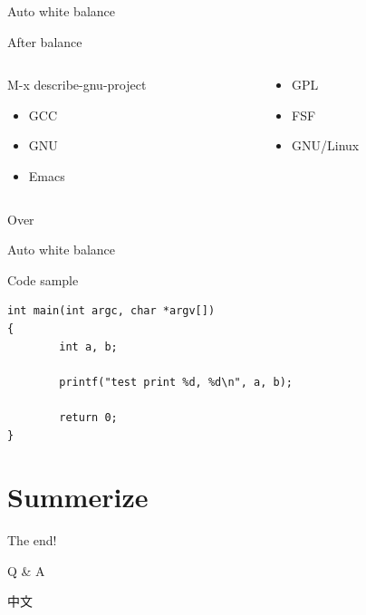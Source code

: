 \documentclass[presentation]{beamer}
\begin{document}
\begin{frame}[label={sec:org63d3bad}]{Auto white balance}
\begin{block}{After balance}
\begin{columns}
\begin{column}{0.45\columnwidth}
\begin{block}{M-x describe-gnu-project}
\begin{itemize}
\item GCC
\item GNU
\item Emacs
\end{itemize}
\end{block}
\end{column}
\begin{column}{0.45\columnwidth}
\begin{block}{}
\begin{itemize}
\item GPL
\item FSF
\item GNU/Linux
\end{itemize}
\end{block}
\end{column}
\end{columns}
\begin{block}{Over}
\end{block}
\end{block}
\end{frame}
\begin{frame}[label={sec:org6e0b067},fragile]{Auto white balance}
 \begin{block}{Code sample}
\begin{verbatim}
int main(int argc, char *argv[])
{
        int a, b;

        printf("test print %d, %d\n", a, b);

        return 0;
}

\end{verbatim}
\end{block}
\end{frame}
\section{Summerize}
\label{sec:orga5bca62}
\begin{frame}[label={sec:orgb1887df}]{The end!}
\begin{block}{Q \& A}
\end{block}
\begin{block}{\alert{中文}}
\end{block}
\end{frame}
\end{document}
